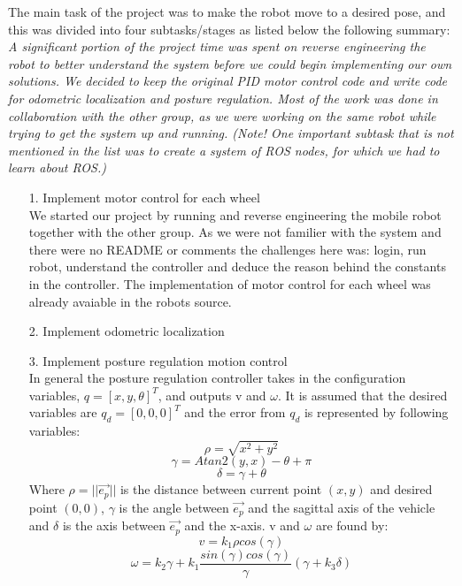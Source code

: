 \documentclass[a4paper,10pt]{article}
\begin{document}
The main task of the project was to make the robot move to a desired pose, and this was divided into four subtasks/stages as listed below the following summary:\\  
\textit{A significant portion of the project time was spent on reverse engineering the robot to better understand the system before we could begin implementing our own solutions.  
We decided to keep the original PID motor control code and write code for odometric localization and posture regulation. 
Most of the work was done in collaboration with the other group, 
as we were working on the same robot while trying to get the system up and running.
(Note! One important subtask that is not mentioned in the list was to create a system of ROS nodes, for which we had to learn about ROS.)}

\begin{itemize}
	\item[1.]Implement motor control for each wheel \\
		We started our project by running and reverse engineering the mobile robot together with the other group. 
		As we were not familier with the system and there were no README or comments the challenges here was: 
		login, run robot, understand the controller and deduce the reason behind the constants in the controller.
		The implementation of motor control for each wheel was already avaiable in the robots source. 
		
	\item[2.]Implement odometric localization
	\item[3.]Implement posture regulation motion control \\
		In general the posture regulation controller takes in the configuration variables, $q = [x, y, \theta]^{T}$, 
		and outputs v and $\omega$.
		It is assumed that the desired variables are $q_{d} = [0, 0, 0]^{T}$ and the error from $q_{d}$ is represented by following variables:
		\[
			\rho = \sqrt{x^{2} + y^{2}} 
		\]\[
			\gamma = Atan2(y, x) - \theta + \pi
		\]\[
			\delta = \gamma + \theta
		\]
		Where $\rho = ||\vec{e_{p}}||$ is the distance between current point $(x, y)$ and desired point $(0, 0)$, 
		$\gamma$ is the angle between $\vec{e_{p}}$	and the sagittal axis of the vehicle and $\delta$ is the axis between $\vec{e_{p}}$ and the x-axis.	
		v and $\omega$ are found by:
		\begin{equation}
			v = k_{1}\rho cos(\gamma)
		\end{equation}		
		\begin{equation}
			\omega = k_{2}\gamma + k_{1}\frac{sin(\gamma)cos(\gamma)}{\gamma}(\gamma + k_{3}\delta)
		\end{equation}
		

\end{itemize}
\end{document}
